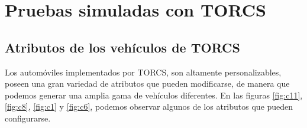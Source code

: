 \chapter{Pruebas simuladas con TORCS}
\label{ape:pruebasT}

\section{Atributos de los vehículos de TORCS}
\label{ape:atributos}

Los automóviles implementados por TORCS, son altamente personalizables, poseen una gran variedad de atributos que pueden modificarse, de manera que podemos generar una amplia gama de vehículos diferentes. En las figuras \ref{fig:c11}, \ref{fig:c8}, \ref{fig:c1} y \ref{fig:c6}, podemos observar algunos de los atributos que pueden configurarse.


